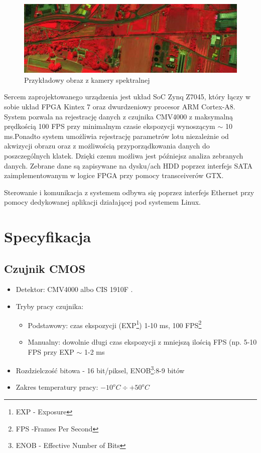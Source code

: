 \documentclass[a4paper,11pt,oneside]{article}  %
\begin{document}
\begin{figure}[htp]
	\centering
	\includegraphics[width=12cm]{spektrop_ex.jpg}
	\caption{Przykładowy obraz z kamery spektralnej\cite{SPEC_PHOTO}}
	\label{fig:EX_PHOTO}
\end{figure}


Sercem zaprojektowanego urządzenia jest układ SoC Zynq Z7045, który łączy w sobie układ FPGA Kintex 7 oraz dwurdzeniowy procesor ARM Cortex-A8. System pozwala na rejestrację danych z czujnika CMV4000 z maksymalną prędkością 100 FPS przy minimalnym czasie ekspozycji wynoszącym $\sim$ 10 ms.Ponadto system umożliwia rejestrację parametrów lotu niezależnie od akwizycji obrazu oraz z możliwością przyporządkowania danych do poszczególnych klatek. Dzięki czemu możliwa jest późniejsz analiza zebranych danych. Zebrane dane są zapisywane na dysku/ach HDD poprzez interfejs SATA zaimplementowanym w logice FPGA przy pomocy transceiverów GTX.

Sterowanie i komunikacja z systemem odbywa się poprzez interfejs Ethernet przy pomocy dedykowanej aplikacji działającej pod systemem Linux. 


\section{Specyfikacja}

\subsection{Czujnik CMOS}
\begin{itemize}
	\item Detektor: CMV4000 \cite{CMV4000} albo CIS 1910F \cite{CIS}.
	\item Tryby pracy czujnika:
		\begin{itemize}
			\item Podstawowy: czas ekspozycji (EXP\footnote{EXP - Exposure}) 1-10 ms, 100 FPS\footnote{FPS -Frames Per Second}
			\item Manualny:	dowolnie długi czas ekspozycji z mniejszą ilością FPS (np. 5-10 FPS przy EXP $\sim$ 1-2 ms
		\end{itemize}

	\item Rozdzielczość bitowa - 16 bit/piksel, ENOB\footnote{ENOB - Effective Number of Bits}:8-9 bitów
	\item Zakres temperatury pracy: $-10^{o}C \div +50^{o}C$

\end{itemize}
\end{document}
